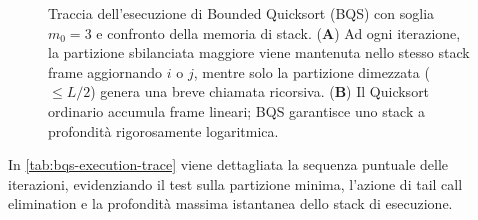 \begin{figure}[H]
  \caption{Traccia dell'esecuzione di Bounded Quicksort (BQS) con soglia $m_0=3$ e confronto della memoria di stack. (\textbf{A}) Ad ogni iterazione, la partizione sbilanciata maggiore viene mantenuta nello stesso stack frame aggiornando $i$ o $j$, mentre solo la partizione dimezzata ($\le L/2$) genera una breve chiamata ricorsiva. (\textbf{B}) Il Quicksort ordinario accumula frame lineari; BQS garantisce uno stack a profondità rigorosamente logaritmica.}
  \label{fig:bqs-trace-and-stack}
\end{figure}

In \autoref{tab:bqs-execution-trace} viene dettagliata la sequenza puntuale delle iterazioni, evidenziando il test sulla partizione minima, l'azione di tail call elimination e la profondità massima istantanea dello stack di esecuzione.

